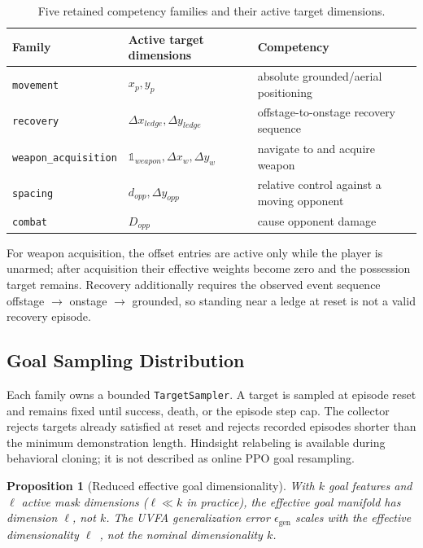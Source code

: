 \documentclass[11pt,a4paper]{article}
\newtheorem{proposition}{Proposition}
\begin{document}
\begin{table}[h]
\centering
\small
\caption{Five retained competency families and their active target dimensions.}
\label{tab:goal-types}
\begin{tabular}{@{}lll@{}}
\toprule
\textbf{Family} & \textbf{Active target dimensions} & \textbf{Competency} \\
\midrule
\texttt{movement} & $x_p,y_p$ & absolute grounded/aerial positioning \\
\texttt{recovery} & $\Delta x_{ledge},\Delta y_{ledge}$ & offstage-to-onstage recovery sequence \\
\texttt{weapon\_acquisition} & $\mathbb{1}_{weapon},\Delta x_w,\Delta y_w$ & navigate to and acquire weapon \\
\texttt{spacing} & $d_{opp},\Delta y_{opp}$ & relative control against a moving opponent \\
\texttt{combat} & $D_{opp}$ & cause opponent damage \\
\bottomrule
\end{tabular}
\end{table}

For weapon acquisition, the offset entries are active only while the player is unarmed;
after acquisition their effective weights become zero and the possession target remains.
Recovery additionally requires the observed event sequence offstage $\rightarrow$ onstage
$\rightarrow$ grounded, so standing near a ledge at reset is not a valid recovery episode.

\subsection{Goal Sampling Distribution}
\label{sec:goal-sampling}

Each family owns a bounded \texttt{TargetSampler}. A target is sampled at episode reset
and remains fixed until success, death, or the episode step cap. The collector rejects
targets already satisfied at reset and rejects recorded episodes shorter than the minimum
demonstration length. Hindsight relabeling is available during behavioral cloning; it is
not described as online PPO goal resampling.

\begin{proposition}[Reduced effective goal dimensionality]
\label{prop:dim-reduction}
With $k$ goal features and $\ell$ active mask dimensions ($\ell \ll k$ in practice), the effective goal manifold has dimension $\ell$, not $k$.
The UVFA generalization error $\epsilon_{\text{gen}}$ scales with the effective dimensionality $\ell$~\cite{schaul2015universal}, not the nominal dimensionality $k$.
\end{proposition}
\end{document}
